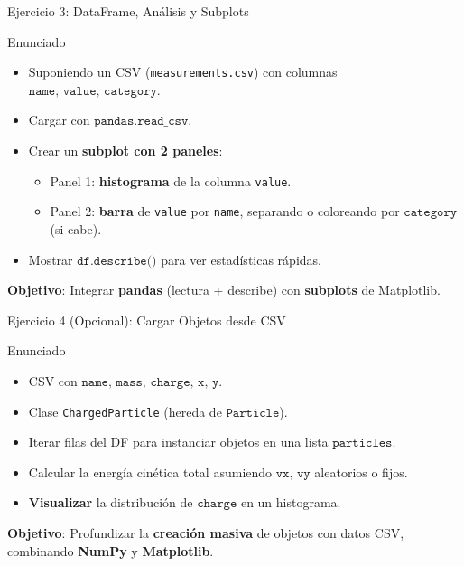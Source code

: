 \documentclass[10pt]{beamer}
\begin{document}
\begin{frame}{Ejercicio 3: DataFrame, Análisis y Subplots}
  \begin{block}{Enunciado}
    \begin{itemize}
      \item Suponiendo un CSV (\texttt{measurements.csv}) con columnas \(\texttt{name, value, category}\).
      \item Cargar con \(\texttt{pandas.read\_csv}\).
      \item Crear un \textbf{subplot con 2 paneles}:
        \begin{itemize}
          \item Panel 1: \textbf{histograma} de la columna \texttt{value}.
          \item Panel 2: \textbf{barra} de \texttt{value} por \texttt{name}, separando o coloreando por \(\texttt{category}\) (si cabe).
        \end{itemize}
      \item Mostrar \(\texttt{df.describe()}\) para ver estadísticas rápidas.
    \end{itemize}
  \end{block}
  \textbf{Objetivo}: Integrar \textbf{pandas} (lectura + describe) con \textbf{subplots} de Matplotlib.
\end{frame}

\begin{frame}{Ejercicio 4 (Opcional): Cargar Objetos desde CSV}
  \begin{block}{Enunciado}
    \begin{itemize}
      \item CSV con \(\texttt{name, mass, charge, x, y}\).
      \item Clase \texttt{ChargedParticle} (hereda de \(\texttt{Particle}\)).
      \item Iterar filas del DF para instanciar objetos en una lista \(\texttt{particles}\).
      \item Calcular la energía cinética total asumiendo \(\texttt{vx, vy}\) aleatorios o fijos.
      \item \textbf{Visualizar} la distribución de \(\texttt{charge}\) en un histograma.
    \end{itemize}
  \end{block}
  \textbf{Objetivo}: Profundizar la \textbf{creación masiva} de objetos con datos CSV, combinando \textbf{NumPy} y \textbf{Matplotlib}.
\end{frame}
\end{document}
